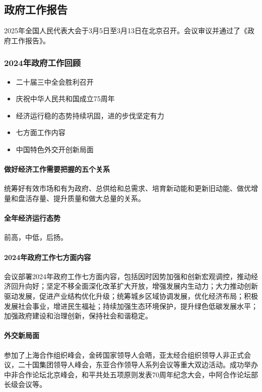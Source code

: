 \subsection{政府工作报告}

2025年全国人民代表大会于3月5日至3月13日在北京召开。会议审议并通过了《政府工作报告》。

\subsubsection{2024年政府工作回顾}

\begin{itemize}
    \item 二十届三中全会胜利召开
    \item 庆祝中华人民共和国成立75周年
    \item 经济运行稳的态势持续巩固，进的步伐坚定有力
    \item 七方面工作内容
    \item 中国特色外交开创新局面
\end{itemize}

\paragraph{做好经济工作需要把握的五个关系} 统筹好有效市场和有为政府、总供给和总需求、培育新动能和更新旧动能、做优增量和盘活存量、提升质量和做大总量的关系。

\paragraph{全年经济运行态势} 前高，中低，后扬。

\paragraph{2024年政府工作七方面内容} 会议部署2024年政府工作七方面内容，包括因时因势加强和创新宏观调控，推动经济回升向好；坚定不移全面深化改革扩大开放，增强发展内生动力；大力推动创新驱动发展，促进产业结构优化升级；统筹城乡区域协调发展，优化经济布局；积极发展社会事业，增进民生福祉；持续加强生态环境保护，提升绿色低碳发展水平；加强政府建设和治理创新，保持社会和谐稳定。

\paragraph{外交新局面} 参加了上海合作组织峰会，金砖国家领导人会晤，亚太经合组织领导人非正式会议，二十国集团领导人峰会，东亚合作领导人系列会议等重大双边活动。成功举办中非合作论坛北京峰会，和平共处五项原则发表70周年纪念大会，中阿合作论坛部长级会议等。

